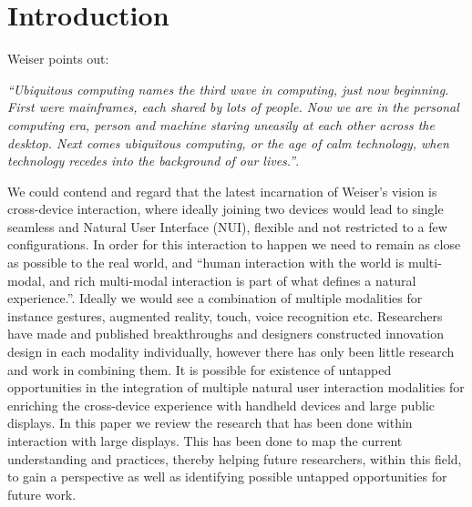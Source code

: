 \section{Introduction}
Weiser\cite{Weiser:1991} points out:
 
{\em``Ubiquitous computing names the third wave in computing, just now beginning. First were mainframes, each shared by lots of people. Now we are in the personal computing era, person and machine staring uneasily at each other across the desktop. Next comes ubiquitous computing, or the age of calm technology, when technology recedes into the background of our lives.''}.

We could contend and regard that the latest incarnation of Weiser's vision is cross-device interaction, where ideally joining two devices would lead to single seamless and Natural User Interface (NUI), flexible and not restricted to a few configurations.
In order for this interaction to happen we need to remain as close as possible to the real world, and ``human interaction with the world is multi-modal, and rich multi-modal interaction is part of what defines a natural experience.''\cite{Jain:2011}. 
Ideally we would see a combination of multiple modalities for instance gestures, augmented reality, touch, voice recognition etc. 
Researchers have made and published breakthroughs and designers constructed innovation design in each modality individually, however there has only been little research and work in combining them.\cite{Jain:2011} 
It is possible for existence of untapped opportunities in the integration of multiple natural user interaction modalities for enriching the cross-device experience with handheld devices and large public displays. 
In this paper we review the research that has been done within interaction with large displays. 
This has been done to map the current understanding and practices, thereby helping future researchers, within this field, to gain a perspective as well as identifying possible untapped opportunities for future work.